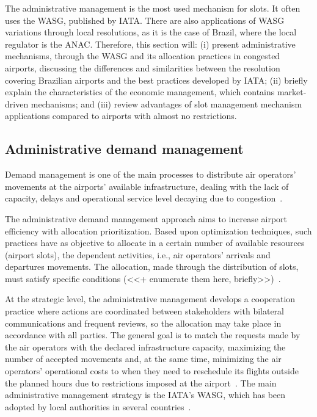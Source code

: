 The administrative management is the most used mechanism for slots.
%
It often uses the \acrfull{WASG}, published by
\acrshort{IATA}\cite{ribeiro2018optimization}.
%
There are also applications of \acrshort{WASG} variations through local
resolutions, as it is the case of Brazil, where the local regulator is
the \acrfull{ANAC}.
%
Therefore, this section will: (i) present administrative mechanisms, through the
\acrshort{WASG} and its allocation practices in congested airports, discussing
the differences and similarities between the resolution covering Brazilian
airports and the best practices developed by \acrshort{IATA}; (ii) briefly
explain the characteristics of the economic management, which contains
market-driven mechanisms; and (iii) review advantages of slot management
mechanism applications compared to airports with almost no restrictions.




\subsection{Administrative demand management}
\label{subsec:admDemMan}



Demand management is one of the main processes to distribute air operators’
movements at the airports’ available infrastructure, dealing with the lack of
capacity, delays and operational service level decaying due to
congestion~\cite{zografos2017increasing, ribeiro2018optimization}.



The administrative demand management approach aims to increase airport
efficiency with allocation prioritization.
%
Based upon optimization techniques, such practices have as objective to allocate
in a certain number of available resources (airport slots), the dependent
activities, i.e., air operators’ arrivals and departures movements.
%
The allocation, made through the distribution of slots, must satisfy specific
conditions (<<+ enumerate them here, briefly>>)~\cite{zografos2017increasing}.




At the strategic level, the administrative management develops a cooperation
practice where actions are coordinated between stakeholders with bilateral
communications and frequent reviews, so the allocation may take place in
accordance with all parties.
%
The general goal is to match the requests made by the air operators with
the declared infrastructure capacity, maximizing the number of accepted
movements and, at the same time, minimizing the air operators’ operational costs
to when they need to reschedule its flights outside the planned hours due to
restrictions imposed at the airport~\cite {gillen2016airport}.
%
The main administrative management strategy is the
\acrshort{IATA}’s \acrshort{WASG}, which has been adopted by local authorities
in several countries~\cite{zografos2017increasing, fairbrother2018development,
cavusoglu2021minimum}.



